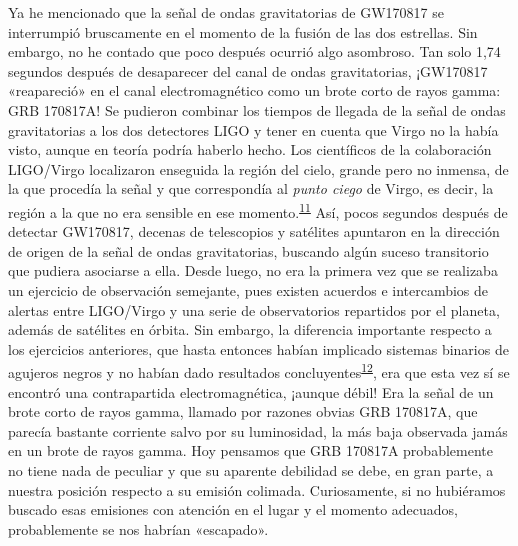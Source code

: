 Ya he mencionado que la señal de ondas gravitatorias de GW170817 se interrumpió bruscamente en el momento de la fusión de las dos estrellas. Sin embargo, no he contado que poco después ocurrió algo asombroso. Tan solo 1,74 segundos después de desaparecer del canal de ondas gravitatorias, ¡GW170817 «reapareció» en el canal electromagnético como un brote corto de rayos gamma: GRB 170817A! Se pudieron combinar los tiempos de llegada de la señal de ondas gravitatorias a los dos detectores LIGO y tener en cuenta que Virgo no la había visto, aunque en teoría podría haberlo hecho. Los científicos de la colaboración LIGO/Virgo localizaron enseguida la región del cielo, grande pero no inmensa, de la que procedía la señal y que correspondía al \emph{punto ciego} de Virgo, es decir, la región a la que no era sensible en ese momento.\textsuperscript{\hyperlink{note:08-11}{11}} Así, pocos segundos después de detectar GW170817, decenas de telescopios y satélites apuntaron en la dirección de origen de la señal de ondas gravitatorias, buscando algún suceso transitorio que pudiera asociarse a ella. Desde luego, no era la primera vez que se realizaba un ejercicio de observación semejante, pues existen acuerdos e intercambios de alertas entre LIGO/Virgo y una serie de observatorios repartidos por el planeta, además de satélites en órbita. Sin embargo, la diferencia importante respecto a los ejercicios anteriores, que hasta entonces habían implicado sistemas binarios de agujeros negros y no habían dado resultados concluyentes\textsuperscript{\hyperlink{note:08-12}{12}}, era que esta vez sí se encontró una contrapartida electromagnética, ¡aunque débil! Era la señal de un brote corto de rayos gamma, llamado por razones obvias GRB 170817A, que parecía bastante corriente salvo por su luminosidad, la más baja observada jamás en un brote de rayos gamma. Hoy pensamos que GRB 170817A probablemente no tiene nada de peculiar y que su aparente debilidad se debe, en gran parte, a nuestra posición respecto a su emisión colimada. Curiosamente, si no hubiéramos buscado esas emisiones con atención en el lugar y el momento adecuados, probablemente se nos habrían «escapado».

